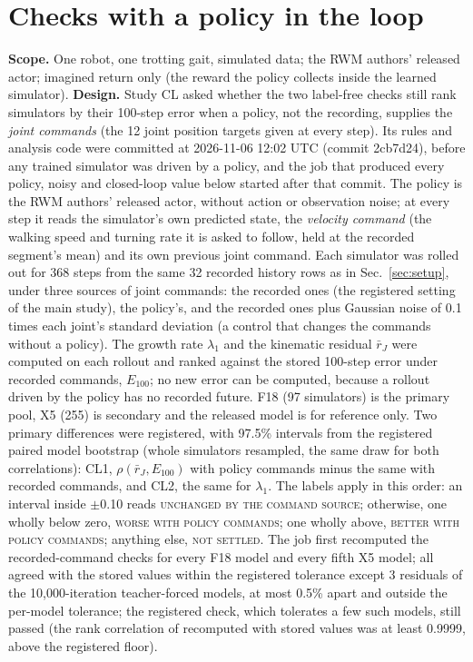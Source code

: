 \FloatBarrier
\section{Checks with a policy in the loop}\label{app:A8}
\textbf{Scope.} One robot, one trotting gait, simulated data; the RWM authors' released actor; imagined return only (the reward the policy collects inside the learned simulator).
\textbf{Design.} Study CL asked whether the two label-free checks still rank simulators by their 100-step error when
a policy, not the recording, supplies the \emph{joint commands} (the 12 joint position targets given at every step).
Its rules and analysis code were committed at 2026-11-06 12:02 UTC (commit 2cb7d24), before any trained
simulator was driven by a policy, and the job that produced every policy, noisy and closed-loop value below started after that commit. The policy
is the RWM authors' released actor, without action or observation noise; at every step it reads the simulator's own
predicted state, the \emph{velocity command} (the walking speed and turning rate it is asked to follow, held at the
recorded segment's mean) and its own previous joint command. Each simulator was rolled out for 368 steps from the same
32 recorded history rows as in Sec.~\ref{sec:setup}, under three sources of joint commands: the recorded ones (the
registered setting of the main study), the policy's, and the recorded ones plus Gaussian noise of 0.1
times each joint's standard deviation (a control that changes the commands without a policy). The growth rate $\lambda_1$ and the
kinematic residual $\bar r_J$ were computed on each rollout and ranked against the stored 100-step error under
recorded commands, $E_{100}$; no new error can be computed, because a rollout driven by the policy has no recorded
future. F18 (97 simulators) is the primary pool, X5 (255) is secondary and the released model is
for reference only. Two primary differences were registered, with 97.5\% intervals from the registered paired model
bootstrap (whole simulators resampled, the same draw for both correlations): CL1, $\rho(\bar r_J,E_{100})$ with policy commands minus the same with recorded commands, and CL2, the
same for $\lambda_1$. The labels apply in this order: an interval inside $\pm$0.10 reads \textsc{unchanged by the command source}; otherwise, one
wholly below zero, \textsc{worse with policy commands}; one wholly above, \textsc{better with policy commands};
anything else, \textsc{not settled}. The job first recomputed the recorded-command checks for every F18 model and
every fifth X5 model; all agreed with the stored values within the registered tolerance except 3
residuals of the 10{,}000-iteration teacher-forced models, at most 0.5\% apart and outside the per-model tolerance; the registered
check, which tolerates a few such models, still passed (the rank correlation of recomputed with stored values was at least 0.9999, above the registered floor).

